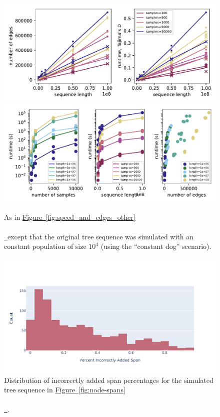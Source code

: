 \documentclass[10pt,twoside,lineno]{gsajnl}
\newcommand*{\figref}[2][]{%
	\hyperref[{#2}]{%
		Figure~\ref*{#2}%
		\ifx\\#1\\%
		\else
		\,#1%
		\fi
	}%
}
\begin{document}
\begin{figure}
    \includegraphics{benchmarks/constant_pop_results_absolute_values}
    \includegraphics{benchmarks/constant_pop_results_timing}
    \caption{
        As in \figref{fig:speed_and_edges_other} except that
        the original tree sequence was simulated with an constant population
        of size $10^4$ (using the ``constant dog'' scenario).
        \label{fig:speed_and_edges_other_constant}
    }
\end{figure}

\begin{figure}[!hbt]
	\includegraphics{newplots_wo_ee/figure-4b-supplement}
	\caption{Distribution of incorrectly added span percentages
		for the simulated tree sequence in \figref{fig:node-spans}.}
	\label{fig:incorrect_ratio}
\end{figure}
\end{document}
